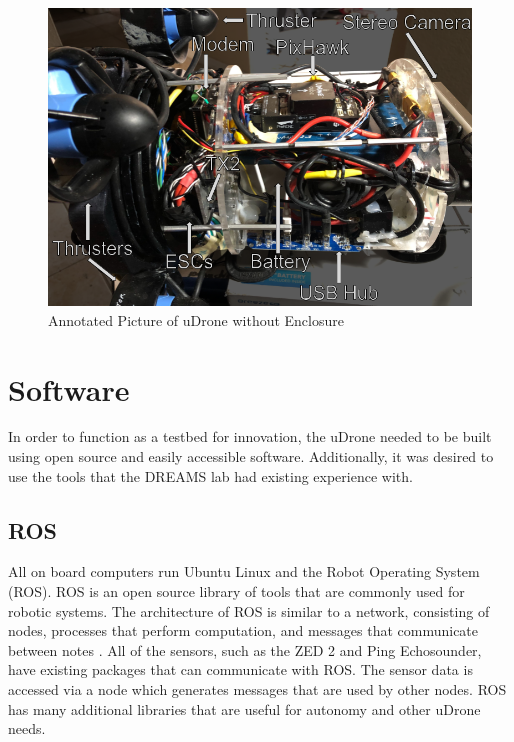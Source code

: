 \begin{figure}[ht]
\includegraphics[width=\maxwidth{\textwidth}]{img/side_annotated.png}
\caption{Annotated Picture of uDrone without Enclosure}
\label{annotated}
\end{figure}

\section{Software}
In order to function as a testbed for innovation, the uDrone needed to be built using open source and easily accessible software. Additionally, it was desired to use the tools that the DREAMS lab had existing experience with.

\subsection{ROS}
All on board computers run Ubuntu Linux and the Robot Operating System (ROS). ROS is an open source library of tools that are commonly used for robotic systems. The architecture of ROS is similar to a network, consisting of nodes, processes that perform computation, and messages that communicate between notes \parencite{ros,ros-wiki}. All of the sensors, such as the ZED 2 and Ping Echosounder, have existing packages that can communicate with ROS. The sensor data is accessed via a node which generates messages that are used by other nodes. ROS has many additional libraries that are useful for autonomy and other uDrone needs.

